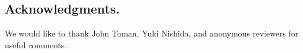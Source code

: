 \subsection*{Acknowledgments.}
We would like to thank John Toman, Yuki Nishida, and anonymous reviewers for useful comments.